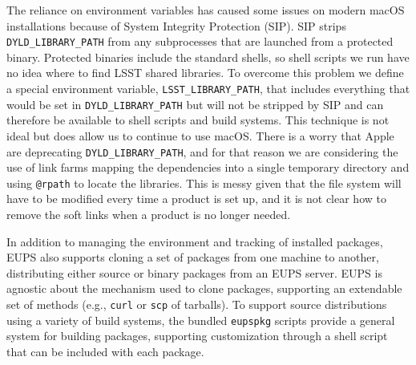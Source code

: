 The reliance on environment variables has caused some issues on modern macOS installations because of System Integrity Protection (SIP).\cite{DMTN-001}
SIP strips \texttt{DYLD\_LIBRARY\_PATH} from any subprocesses that are launched from a protected binary.
Protected binaries include the standard shells, so shell scripts we run have no idea where to find LSST shared libraries.
To overcome this problem we define a special environment variable, \texttt{LSST\_LIBRARY\_PATH}, that includes everything that would be set in \texttt{DYLD\_LIBRARY\_PATH} but will not be stripped by SIP and can therefore be available to shell scripts and build systems.
This technique is not ideal but does allow us to continue to use macOS.
There is a worry that Apple are deprecating \texttt{DYLD\_LIBRARY\_PATH}, and for that reason we are considering the use of link farms mapping the dependencies into a single temporary directory and using \texttt{@rpath} to locate the libraries.
This is messy given that the file system will have to be modified every time a product is set up, and it is not clear how to remove the soft links when a product is no longer needed.

In addition to managing the environment and tracking of installed packages, EUPS also supports cloning a set of packages from one machine to another, distributing either source or binary packages from an EUPS server.
EUPS is agnostic about the mechanism used to clone packages, supporting an extendable set of methods (e.g., \texttt{curl} or \texttt{scp} of tarballs).
To support source distributions using a variety of build systems, the bundled \texttt{eupspkg} scripts provide a general system for building packages, supporting customization through a shell script that can be included with each package.
